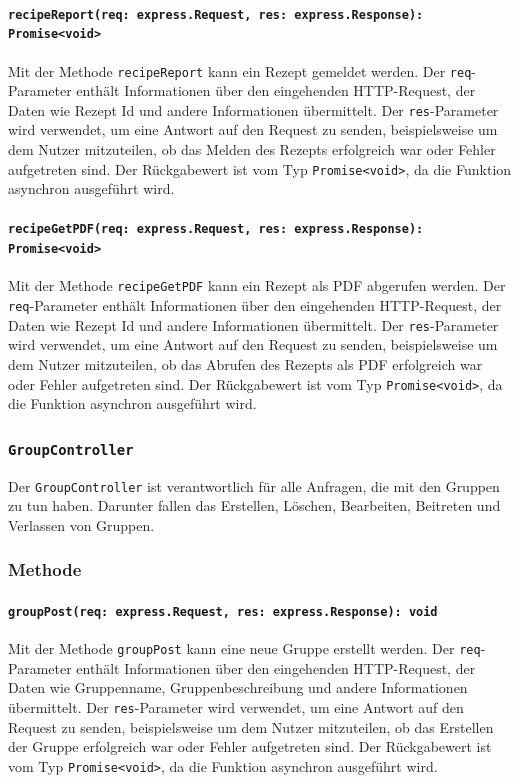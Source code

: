 \documentclass{entwurfsheft}
\begin{document}
\paragraph{\texttt{recipeReport(req: express.Request, res: express.Response): Promise<void>}}
Mit der Methode \texttt{recipeReport} kann ein Rezept gemeldet werden. Der \texttt{req}-Parameter enthält Informationen über den eingehenden HTTP-Request, der Daten wie Rezept Id und andere Informationen übermittelt. Der \texttt{res}-Parameter wird verwendet, um eine Antwort auf den Request zu senden, beispielsweise um dem Nutzer mitzuteilen, ob das Melden des Rezepts erfolgreich war oder Fehler aufgetreten sind.
Der Rückgabewert ist vom Typ \texttt{Promise<void>}, da die Funktion asynchron ausgeführt wird.
\paragraph{\texttt{recipeGetPDF(req: express.Request, res: express.Response): Promise<void>}}
Mit der Methode \texttt{recipeGetPDF} kann ein Rezept als PDF abgerufen werden. Der \texttt{req}-Parameter enthält Informationen über den eingehenden HTTP-Request, der Daten wie Rezept Id und andere Informationen übermittelt. Der \texttt{res}-Parameter wird verwendet, um eine Antwort auf den Request zu senden, beispielsweise um dem Nutzer mitzuteilen, ob das Abrufen des Rezepts als PDF erfolgreich war oder Fehler aufgetreten sind.
Der Rückgabewert ist vom Typ \texttt{Promise<void>}, da die Funktion asynchron ausgeführt wird.


\subsubsection{\texttt{GroupController}}\label{sec:GroupController}
Der \texttt{GroupController} ist verantwortlich für alle Anfragen, die mit den Gruppen zu tun haben. Darunter fallen das Erstellen, Löschen, Bearbeiten, Beitreten und Verlassen von Gruppen.
\subsubsection*{Methode}
\paragraph{\texttt{groupPost(req: express.Request, res: express.Response): void}}
Mit der Methode \texttt{groupPost} kann eine neue Gruppe erstellt werden. Der \texttt{req}-Parameter enthält Informationen über den eingehenden HTTP-Request, der Daten wie Gruppenname, Gruppenbeschreibung und andere Informationen übermittelt. Der \texttt{res}-Parameter wird verwendet, um eine Antwort auf den Request zu senden, beispielsweise um dem Nutzer mitzuteilen, ob das Erstellen der Gruppe erfolgreich war oder Fehler aufgetreten sind.
Der Rückgabewert ist vom Typ \texttt{Promise<void>}, da die Funktion asynchron ausgeführt wird.
\end{document}
